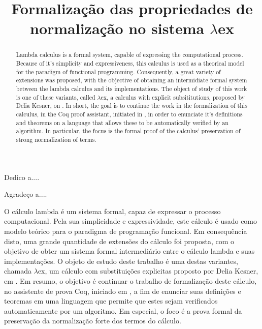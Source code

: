 \documentclass[bacharelado]{unb-cic}
\title{Formalização das propriedades de normalização no sistema $\lambda$ex}%
\begin{document}
  \maketitle
  \pretextual

  \begin{dedicatoria}
  Dedico a....
  \end{dedicatoria}

  \begin{agradecimentos}
  Agradeço a....
  \end{agradecimentos}

  \begin{resumo}
    O cálculo lambda é um sistema formal, capaz de expressar o processo
    computacional.  Pela sua simplicidade e expressividade, este cálculo é usado
    como modelo teórico para o paradigma de programação funcional. Em consequência
    disto, uma grande quantidade de extensões do cálculo foi proposta, com o
    objetivo de obter um sistema formal intermediário entre o cálculo lambda e suas
    implementações.  O objeto de estudo deste trabalho é uma destas variantes,
    chamada $\lambda$ex, um cálculo com substituições explicitas proposto por Delia
    Kesner, em \cite{delia}.  Em resumo, o objetivo é continuar o trabalho de
    formalização deste cálculo, no assistente de prova Coq, iniciado em
    \cite{initial}, a fim de enunciar suas definições e teoremas em uma linguagem
    que permite que estes sejam verificados automaticamente por um algoritmo.  Em
    especial, o foco é a prova formal da preservação da normalização forte dos
    termos do cálculo.
  \end{resumo}

  \begin{abstract}
    Lambda calculus is a formal system, capable of expressing the computational
    process.  Because of it's simplicity and expressiveness, this calculus is used
    as a theorical model for the paradigm of functional programming. Consequently, a
    great variety of extensions was proposed, with the objective of obtaining an
    intermidiate formal system between the lambda calculus and its implementations.
    The object of study of this work is one of these variants, called $\lambda$ex, a
    calculus with explicit subsititutions, proposed by Delia Kesner, on
    \cite{delia}.  In short, the goal is to continue the work in the formalization
    of this calculus, in the Coq proof assistant, initiated in \cite{initial}, in
    order to enunciate it's definitions and theorems on a language that allows these
    to be automatically verified by an algorithm.  In particular, the focus is the
    formal proof of the calculus' preservation of strong normalization of terms.
  \end{abstract}

  \tableofcontents
  \listoffigures
  \listoftables

  \textual
  
  
  

  \postextual
  
  
\end{document}
